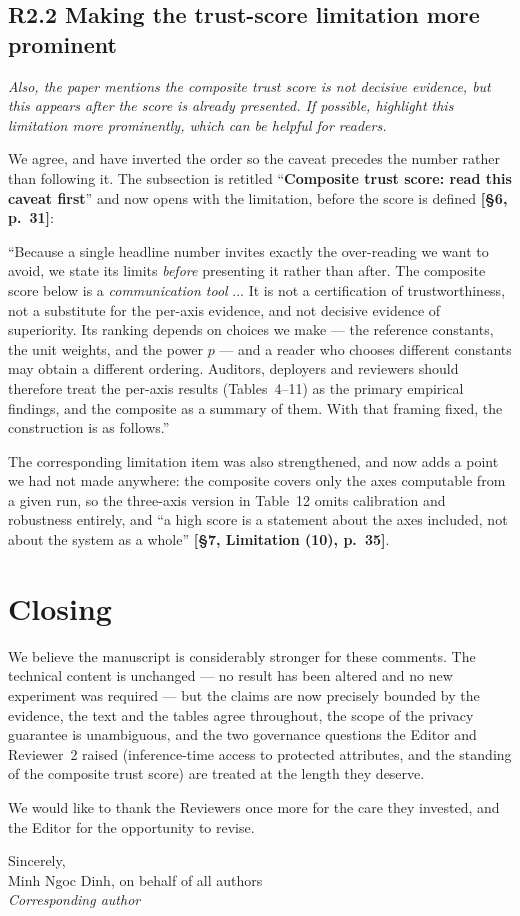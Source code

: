 \documentclass[11pt,a4paper]{article}
\newenvironment{comment}
  {\begin{mdframed}[backgroundcolor=quotegray,linewidth=0pt,skipabove=8pt,
    skipbelow=6pt,innertopmargin=6pt,innerbottommargin=6pt]\itshape}
  {\end{mdframed}}
\newenvironment{newtextbox}
  {\begin{mdframed}[linecolor=newtext!45,linewidth=0.8pt,skipabove=6pt,
    skipbelow=8pt,innertopmargin=6pt,innerbottommargin=6pt]\small}
  {\end{mdframed}}
\newcommand{\where}[1]{\textcolor{revblue}{\textbf{[#1]}}}
\begin{document}
\subsection*{R2.2 Making the trust-score limitation more prominent}
\label{sec:r2-2}

\begin{comment}
Also, the paper mentions the composite trust score is not decisive evidence, but
this appears after the score is already presented. If possible, highlight this
limitation more prominently, which can be helpful for readers.
\end{comment}

We agree, and have inverted the order so the caveat precedes the number rather
than following it. The subsection is retitled
``\textbf{Composite trust score: read this caveat first}'' and now opens with the
limitation, before the score is defined \where{\S6, p.~31}:

\begin{newtextbox}
``Because a single headline number invites exactly the over-reading we want to
avoid, we state its limits \emph{before} presenting it rather than after. The
composite score below is a \emph{communication tool} $\dots$ It is not a
certification of trustworthiness, not a substitute for the per-axis evidence,
and not decisive evidence of superiority. Its ranking depends on choices we make
--- the reference constants, the unit weights, and the power $p$ --- and a reader
who chooses different constants may obtain a different ordering. Auditors,
deployers and reviewers should therefore treat the per-axis results (Tables~4--11)
as the primary empirical findings, and the composite as a summary of them. With
that framing fixed, the construction is as follows.''
\end{newtextbox}

The corresponding limitation item was also strengthened, and now adds a point we
had not made anywhere: the composite covers only the axes computable from a given
run, so the three-axis version in Table~12 omits calibration and robustness
entirely, and ``a high score is a statement about the axes included, not about
the system as a whole'' \where{\S7, Limitation (10), p.~35}.

\section{Closing}

We believe the manuscript is considerably stronger for these comments. The
technical content is unchanged --- no result has been altered and no new
experiment was required --- but the claims are now precisely bounded by the
evidence, the text and the tables agree throughout, the scope of the privacy
guarantee is unambiguous, and the two governance questions the Editor and
Reviewer~2 raised (inference-time access to protected attributes, and the
standing of the composite trust score) are treated at the length they deserve.

We would like to thank the Reviewers once more for the care they invested, and
the Editor for the opportunity to revise.

\vspace{1em}
Sincerely,\\[0.4em]
Minh Ngoc Dinh, on behalf of all authors\\
\textit{Corresponding author}
\end{document}

